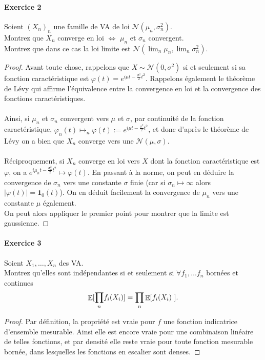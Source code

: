 \documentclass{article}
\theoremstyle{definition}
\numberwithin{equation}{section}
\DeclareMathOperator{\E}{\mathbb{E}}
\begin{document}
\paragraph{Exercice 2}
Soient $(X_n)_n$ une famille de VA de loi $\mathcal{N}(\mu_n,\sigma^2_n)$.\\
Montrez que $X_n$ converge en loi $\Leftrightarrow$ $\mu_n$ et $\sigma_n$ convergent.\\
Montrez que dans ce cas la loi limite est $\mathcal{N}(\lim_n\mu_n,\lim_n\sigma_n^2)$.

\begin{proof}
Avant toute chose, rappelons que $X\sim \mathcal{N}(0,\sigma^2)$ si et seulement si sa fonction caractéristique est $\varphi(t)=e^{i\mu t- \frac{\sigma^2}{2}t^2}$. Rappelons également le théorème de Lévy qui affirme l'équivalence entre la convergence en loi et la convergence des fonctions caractéristiques.\\
~\\
Ainsi, si $\mu_n$ et $\sigma_n$ convergent vers $\mu$ et $\sigma$, par continuité de la fonction caractéristique, $\varphi_n(t) \mapsto_n \varphi(t):=e^{i\mu t- \frac{\sigma^2}{2}t^2}$, et donc d'après le théorème de Lévy on a bien que $X_n$ converge vers une $\mathcal{N}(\mu,\sigma)$.\\
~\\
Réciproquement, si $X_n$ converge en loi vers $X$ dont la fonction caractéristique est $\varphi$, on a $e^{i\mu_n t- \frac{\sigma_n^2}{2}t^2}\mapsto \varphi(t)$. En passant à la norme, on peut en déduire la convergence de $\sigma_n$ vers une constante $\sigma$ finie (car si $\sigma_n\mapsto\infty$ alors $|\varphi(t)|=\mathbf{1}_{0}(t)$). On en déduit facilement la convergence de $\mu_n$ vers une constante $\mu$ également.\\
On peut alors appliquer le premier point pour montrer que la limite est gaussienne.
\end{proof}

\paragraph{Exercice 3}
Soient $X_1,\dots,X_n$ des VA.\\
Montrez qu'elles sont indépendantes si et seulement si $\forall f_1,\dots f_n$ bornées et continues 
$$ \E[{\small\prod_n} f_i(X_i)]={\small\prod_n}\E[f_i(X_i)~]. $$

\begin{proof}
Par définition, la propriété est vraie pour $f$ une fonction indicatrice d'ensemble mesurable. Ainsi elle est encore vraie pour une combinaison linéaire de telles fonctions, et par densité elle reste vraie pour toute fonction mesurable bornée, dans lesquelles les fonctions en escalier sont denses.
\end{proof}
\end{document}
